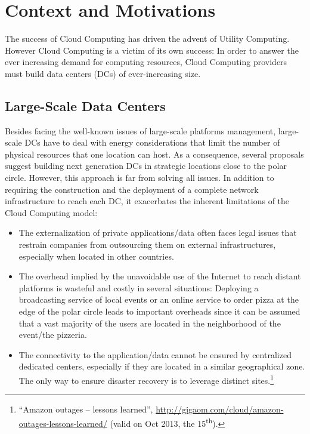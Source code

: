 \section{Context and Motivations}
\label{sec:intro}
The success of Cloud Computing has driven the advent of Utility Computing.
However Cloud Computing is a victim of its own success: In order to answer the
ever increasing demand for computing resources, Cloud Computing providers must
build data centers (DCs) of ever-increasing size. 


\subsection{Large-Scale Data Centers}
Besides facing the well-known
issues of large-scale platforms management, large-scale DCs have to deal with
energy considerations that limit the number of physical resources that one
location can host. As a consequence, several proposals suggest building next
generation DCs in strategic locations close to the polar circle. However, this
approach is far from solving all issues. In addition to requiring the
construction and the deployment of a complete network infrastructure to reach
each DC, it exacerbates the inherent limitations of the Cloud Computing model:

\begin{itemize}
\item The externalization of private applications/data often faces legal issues
that restrain companies from outsourcing them on external infrastructures,
especially when located in other countries. 
\item The overhead implied by the unavoidable use of the Internet to reach
distant platforms is wasteful and costly in several situations: Deploying a
broadcasting service of local events or an online service to order pizza at the
edge of the polar circle leads to important overheads since it can be assumed
that a vast majority of the users are located in the neighborhood of the
event/the pizzeria.  
\item The connectivity to the application/data cannot be ensured by centralized
dedicated centers, especially if they are located in a similar geographical
zone. The only way to ensure disaster recovery is to leverage distinct
sites.\footnote{“Amazon outages – lessons learned”,
\href{http://gigaom.com/cloud/amazon-outages-lessons-learned/}{http://gigaom.com/cloud/amazon-outages-lessons-learned/}
(valid on Oct 2013, the 15\textsuperscript{th}).} 
\end{itemize}


